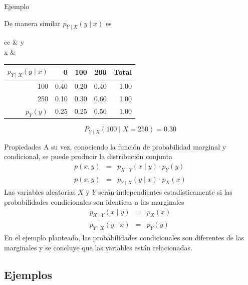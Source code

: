 \documentclass[11pt]{beamer}
\begin{document}
\begin{frame}{Ejemplo}

De manera similar $p_{Y \mid X}(y \mid x)$  es
\begin{center}
\begin{tabular}{cc}
& y \\
x &
\begin{tabular}{r|rrr|r}
$p_{Y \mid X}(y \mid x)$   & 0 &  100 & 200 & Total \\
\hline 
100 & 0.40 & 0.20 & 0.40  & 1.00 \\
250 & 0.10 & 0.30 & 0.60 & 1.00 \\
\hline
 $p_Y(y)$   & 0.25 & 0.25 & 0.50 & 1.00
\end{tabular}
\end{tabular}
\end{center}


$$P_{Y \mid X}(100 \mid X=250)=0.30$$
\end{frame}


\begin{frame}{Propiedades}
A su vez, conociendo la función de probabilidad marginal y condicional, se puede producir la distribución conjunta
\begin{eqnarray*}
p(x,y)&=&p_{X \mid Y}(x\mid y)\cdot p_Y(y) \\
p(x,y)&=&p_{Y \mid X}(y\mid x)\cdot p_X(x) 
\end{eqnarray*}
Las variables aleatorias $X$ y $Y$ serán independientes estadísticamente si las probabilidades condicionales son identicas a las marginales
\begin{eqnarray*}
p_{X \mid Y}(x\mid y) &=&p_X(x) \\
p_{Y \mid X}(y\mid x)&=& p_Y(y) 
\end{eqnarray*}
En el ejemplo planteado, las probabilidades condicionales son diferentes de las marginales y se concluye que las variables están relacionadas.
\end{frame}
\subsection{Ejemplos}
\end{document}
